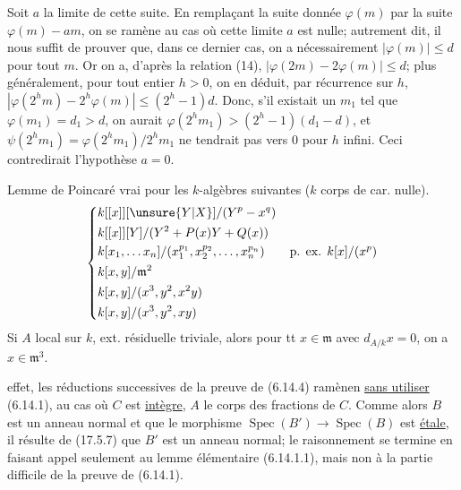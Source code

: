 Soit $a$ la limite de cette suite. En remplaçant la suite donnée $\varphi(m)$ par la suite $\varphi(m)-am$, on se ramène au cas où cette limite $a$ est nulle; autrement dit, il nous suffit de prouver que, dans ce dernier cas, on a nécessairement $|\varphi(m)|\leq d$ pour tout $m$. Or on a, d'après la relation (14), $|\varphi(2m)-2\varphi(m)|\leq d$; plus généralement, pour tout entier $h>0$, on en déduit, par récurrence sur $h$, $|\varphi(2^hm)-2^h\varphi(m)|\leq(2^h-1)d$. Donc, s'il existait un $m_1$ tel que $\varphi(m_1)=d_1>d$, on aurait $\varphi(2^hm_1)>(2^h-1)(d_1-d)$, et $\psi(2^hm_1)=\varphi(2^hm_1)/2^hm_1$ ne tendrait pas vers $0$ pour $h$ infini. Ceci contredirait l'hypothèse $a=0$.


Lemme de Poincaré vrai pour les $k$-algèbres suivantes ($k$ corps de car. nulle).
\[
\left\{\begin{aligned}
&k[[x]][\unsure{Y|X}]/(Y^p-x^q)\\
&k[[x]][Y]/(Y^2+P(x)Y+Q(x))\\
&k[x_1,\ldots x_n]/(x_1^{p_1},x_2^{p_2},\ldots,x_n^{p_n})\qquad\text{p. ex. }k[x]/(x^p)\\
&k[x,y]/\mathfrak m^2\\
&k[x,y]/(x^3,y^2,x^2y)\\
&k[x,y]/(x^3,y^2,xy)
\end{aligned}\right.
\]
Si $A$  local sur $k$, ext. résiduelle triviale, alors pour tt $x\in\mathfrak m$ avec $d_{A/k}x=0$, on a $x\in\mathfrak m^3$.



effet, les réductions successives de la preuve de (6.14.4) ramènen \uline{sans utiliser} (6.14.1), au cas où $C$ est \inserted{/} \uline{intègre}, $A$ le corps des fractions de $C$. Comme alors $B$ est un anneau normal et que le morphisme $\operatorname{Spec}(B')\longrightarrow\operatorname{Spec}(B)$ est \uline{étale}, il résulte de (17.5.7) que $B'$ est un anneau  normal; le raisonnement se termine  en faisant appel seulement au lemme élémentaire  (6.14.1.1), mais non à la partie difficile de la preuve de (6.14.1).


